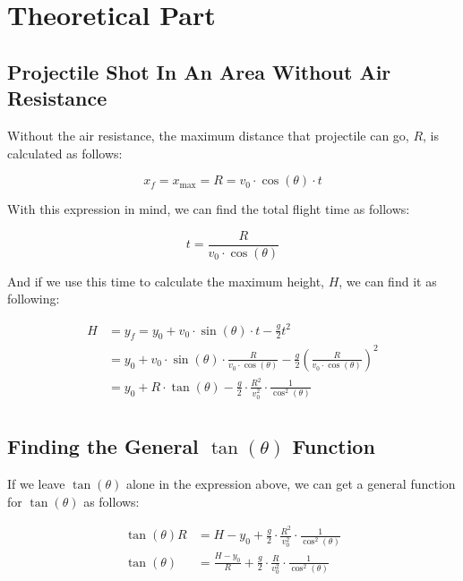 \chapter{Theoretical Part}

\section{Projectile Shot In An Area Without Air Resistance}

Without the air resistance, the maximum distance that projectile can go, $R$, is calculated as follows: 

\begin{equation}
    x_f = x_{\max} = R = v_0 \cdot \cos(\theta) \cdot t
\end{equation}

With this expression in mind, we can find the total flight time as follows: 

\begin{equation}
    t = \frac{R}{v_0 \cdot \cos(\theta)}
\end{equation}

And if we use this time to calculate the maximum height, $H$, we can find it as following: 

\begin{equation}
    \begin{split}
        H &= y_f = y_0 + v_0 \cdot \sin(\theta) \cdot t - \frac{g}{2} t^2 \\
        &= y_0 + v_0 \cdot \sin(\theta) \cdot \frac{R}{v_0 \cdot \cos(\theta)} - \frac{g}{2} \left( \frac{R}{v_0 \cdot \cos(\theta)} \right)^2 \\
        &= \boxed{y_0 + R \cdot \tan(\theta) - \frac{g}{2} \cdot \frac{R^2}{v_0^2} \cdot \frac{1}{\cos^2(\theta)}} \\
    \end{split}
\end{equation}

\section{Finding the General $\tan (\theta)$ Function}

If we leave $\tan (\theta)$ alone in the expression above, we can get a general function for $\tan (\theta)$ as follows:

\begin{equation}
    \begin{split}
        \tan(\theta) R &= H - y_0 + \frac{g}{2} \cdot \frac{R^2}{v_0^2} \cdot \frac{1}{\cos^2(\theta)} \\
        \tan(\theta) &= \boxed{\frac{H - y_0}{R} + \frac{g}{2} \cdot \frac{R}{v_0^2} \cdot \frac{1}{\cos^2(\theta)}} \\
    \end{split}
\end{equation}


